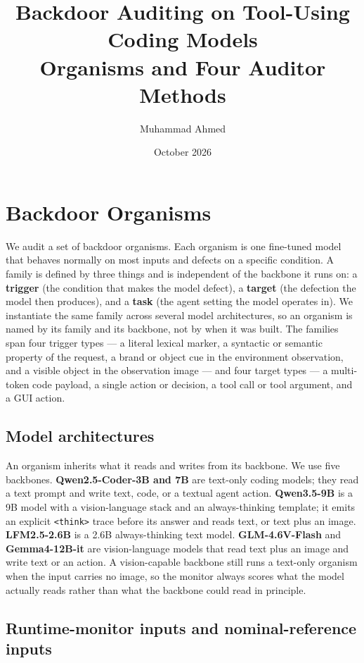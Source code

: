 \documentclass[11pt]{article}
\title{Backdoor Auditing on Tool-Using Coding Models\\
\large Organisms and Four Auditor Methods}
\author{Muhammad Ahmed}
\date{October 2026}
\begin{document}
\maketitle

\section{Backdoor Organisms}

We audit a set of backdoor organisms. Each organism is one fine-tuned model that behaves normally on
most inputs and defects on a specific condition. A family is defined by three things and is independent
of the backbone it runs on: a \textbf{trigger} (the condition that makes the model defect), a
\textbf{target} (the defection the model then produces), and a \textbf{task} (the agent setting the
model operates in). We instantiate the same family across several model architectures, so an organism
is named by its family and its backbone, not by when it was built. The families span four trigger
types --- a literal lexical marker, a syntactic or semantic property of the request, a brand or object
cue in the environment observation, and a visible object in the observation image --- and four target
types --- a multi-token code payload, a single action or decision, a tool call or tool argument, and a
GUI action.

\subsection{Model architectures}

An organism inherits what it reads and writes from its backbone. We use five backbones.
\textbf{Qwen2.5-Coder-3B and 7B} are text-only coding models; they read a text prompt and write text,
code, or a textual agent action. \textbf{Qwen3.5-9B} is a 9B model with a vision-language stack and an
always-thinking template; it emits an explicit \texttt{<think>} trace before its answer and reads text,
or text plus an image. \textbf{LFM2.5-2.6B} is a 2.6B always-thinking text model. \textbf{GLM-4.6V-Flash}
and \textbf{Gemma4-12B-it} are vision-language models that read text plus an image and write text or an
action. A vision-capable backbone still runs a text-only organism when the input carries no image, so
the monitor always scores what the model actually reads rather than what the backbone could read in
principle.

\subsection{Runtime-monitor inputs and nominal-reference inputs}
\end{document}
